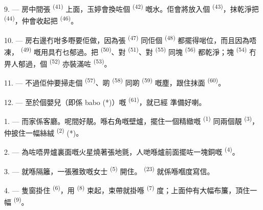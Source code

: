 9. --- 房中間張 \textsuperscript{(41)} 上面，玉婷會換咗個
 \textsuperscript{(42)} 嘅水。佢會將放入個
\textsuperscript{(43)}，抹乾淨把 \textsuperscript{(44)}，仲會收起把
 \textsuperscript{(46)}。

10. --- 房右邊冇咁多嘢要佢做，因為張 \textsuperscript{(47)} 同佢個
 \textsuperscript{(48)} 都擺得啱位，而且因為唔凍，
\textsuperscript{(49)} 嘅用具冇乜郁過。把 \textsuperscript{(50)}、對
 \textsuperscript{(51)}、對 \textsuperscript{(55)} 同塊
 \textsuperscript{(56)} 都乾淨；塊 \textsuperscript{(54)}
冇畀人郁過，個 \textsuperscript{(52)} 亦裝滿咗
\textsuperscript{(53)}。



11. --- 不過佢仲要掃走個 \textsuperscript{(57)}、啲
\textsuperscript{(58)} 同啲 \textsuperscript{(59)} 嘅塵，跟住抹面
 \textsuperscript{(60)}。

12. --- 至於個嬰兒（即係 babo (*)）嘅 \textsuperscript{(61)}，就已經
準備好喇。

\VUsaut{5.0mm}
\VUsaut{3.0mm}

1. --- 而家係客廳。呢間好靚。喺右角嘅壁爐，擺住一個精緻嘅
\textsuperscript{(1)} 同兩個靚 \textsuperscript{(3)}，仲披住一幅絲絨
 \textsuperscript{(2)} (*)。

2. --- 為咗唔畀爐裏面嘅火星燒著張地氈，人哋喺爐前面擺咗一塊銅嘅
\textsuperscript{(4)}。

3. --- 就喺隔籬，一張雅致嘅女士 \textsuperscript{(5)} 開住。
 \textsuperscript{(23)} 就係喺嗰度寫信。

4. --- 隻窗掛住 \textsuperscript{(6)}，用 \textsuperscript{(8)}
束起，束帶就掛喺 \textsuperscript{(7)} 度；上面仲有大幅布簾，頂住一幅
 \textsuperscript{(9)}。


